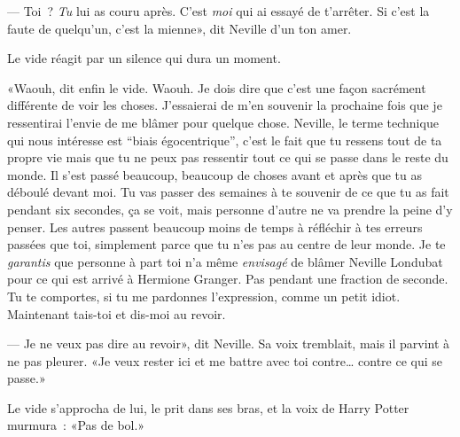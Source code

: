 --- Toi~? \emph{Tu} lui as couru après. C'est \emph{moi} qui ai essayé de t'arrêter. Si c'est la faute de quelqu'un, c'est la mienne», dit Neville d'un ton amer.

Le vide réagit par un silence qui dura un moment.

«Waouh, dit enfin le vide. Waouh. Je dois dire que c'est une façon sacrément différente de voir les choses. J'essaierai de m'en souvenir la prochaine fois que je ressentirai l'envie de me blâmer pour quelque chose. Neville, le terme technique qui nous intéresse est “biais égocentrique”, c'est le fait que tu ressens tout de ta propre vie mais que tu ne peux pas ressentir tout ce qui se passe dans le reste du monde. Il s'est passé beaucoup, beaucoup de choses avant et après que tu as déboulé devant moi. Tu vas passer des semaines à te souvenir de ce que tu as fait pendant six secondes, ça se voit, mais personne d'autre ne va prendre la peine d'y penser. Les autres passent beaucoup moins de temps à réfléchir à tes erreurs passées que toi, simplement parce que tu n'es pas au centre de leur monde. Je te \emph{garantis} que personne à part toi n'a même \emph{envisagé} de blâmer Neville Londubat pour ce qui est arrivé à Hermione Granger. Pas pendant une fraction de seconde. Tu te comportes, si tu me pardonnes l'expression, comme un petit idiot. Maintenant tais-toi et dis-moi au revoir.

--- Je ne veux pas dire au revoir», dit Neville. Sa voix tremblait, mais il parvint à ne pas pleurer. «Je veux rester ici et me battre avec toi contre… contre ce qui se passe.»

Le vide s'approcha de lui, le prit dans ses bras, et la voix de Harry Potter murmura~: «Pas de bol.»
